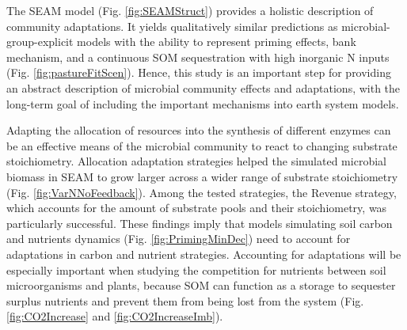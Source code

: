 \conclusions
The SEAM model (Fig. \ref{fig:SEAMStruct}) provides a holistic description of
community adaptations. It yields qualitatively similar predictions as
microbial-group-explicit models with the ability to represent priming effects,
bank mechanism, and a continuous SOM sequestration with high inorganic N inputs
(Fig. \ref{fig:pastureFitScen}). Hence, this study is an important step
for providing an abstract description of microbial community effects and
adaptations, with the long-term goal of including the important mechanisms into
earth system models.

Adapting the allocation of resources into the synthesis of different enzymes can
be an effective means of the microbial community to react to changing substrate
stoichiometry. Allocation adaptation strategies helped the simulated microbial
biomass in SEAM to grow larger across a wider range of substrate stoichiometry
(Fig. \ref{fig:VarNNoFeedback}). Among the tested strategies, the Revenue
strategy, which accounts for the amount of substrate pools and their
stoichiometry, was particularly successful.
These findings imply that models simulating soil carbon and nutrients dynamics
(Fig. \ref{fig:PrimingMinDec}) need to account for adaptations in carbon and
nutrient strategies. Accounting for adaptations will be especially important
when studying the competition for nutrients between soil microorganisms and
plants, because SOM can function as a storage to sequester surplus nutrients and
prevent them from being lost from the system (Fig.
\ref{fig:CO2Increase} and \ref{fig:CO2IncreaseImb}).
